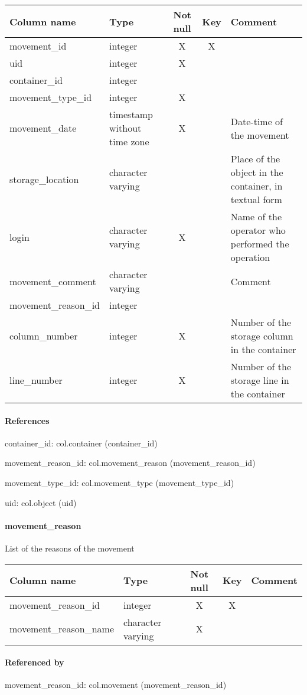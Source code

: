 \begin{tabular}{|l| p{2cm}|c|c| p{5cm}|}
\hline
Column name & Type & Not null & Key & Comment \\
\hline
movement\_id & integer & X & X & \\
uid & integer & X &  & \\
container\_id & integer &  &  & \\
movement\_type\_id & integer & X &  & \\
movement\_date & timestamp without time zone & X &  & Date-time of the movement\\
storage\_location & character varying &  &  & Place of the object in the container, in textual form\\
login & character varying & X &  & Name of the operator who performed the operation\\
movement\_comment & character varying &  &  & Comment\\
movement\_reason\_id & integer &  &  & \\
column\_number & integer & X &  & Number of the storage column in the container\\
line\_number & integer & X &  & Number of the storage line in the container\\
\hline
\end{tabular}
\paragraph{References}
container\_id: col.container (container\_id)

movement\_reason\_id: col.movement\_reason (movement\_reason\_id)

movement\_type\_id: col.movement\_type (movement\_type\_id)

uid: col.object (uid)

\paragraph{movement\_reason}
List of the reasons of the movement

\begin{tabular}{|l| p{2cm}|c|c| p{5cm}|}
\hline
Column name & Type & Not null & Key & Comment \\
\hline
movement\_reason\_id & integer & X & X & \\
movement\_reason\_name & character varying & X &  & \\
\hline
\end{tabular}
\paragraph{Referenced by}
movement\_reason\_id: col.movement (movement\_reason\_id)

